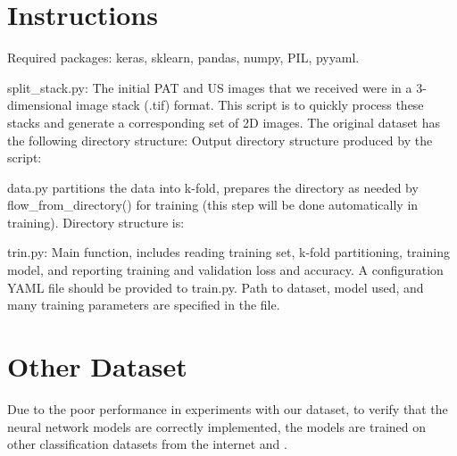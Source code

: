 \chapter{Instructions} %
\label{appendixA}

Required packages: keras, sklearn, pandas, numpy, PIL, pyyaml.

split\_stack.py: The initial PAT and US images that we received were in a 3-dimensional image stack (.tif) format. This script is to quickly process these stacks and generate a corresponding set of 2D images.
The original dataset has the following directory structure:
Output directory structure produced by the script:

data.py partitions the data into k-fold, prepares the directory as needed by flow\_from\_directory() for training (this step will be done automatically in training). Directory structure is:

trin.py: Main function, includes reading training set, k-fold partitioning, training model, and reporting training and validation loss and accuracy. A configuration YAML file should be provided to train.py. Path to dataset, model used, and many training parameters are specified in the file.


\chapter{Other Dataset}
\label{appendixB}
Due to the poor performance in experiments with our dataset, to verify that the neural network models are correctly implemented, the models are trained on other classification datasets from the internet \citep{Janowczyk2016} and \citep{catdog}.

